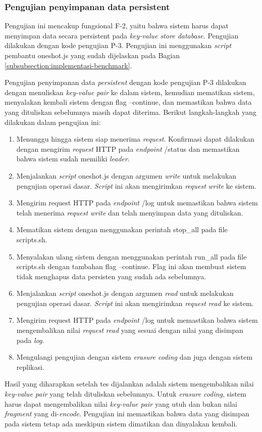 \subsubsection{Pengujian penyimpanan data persistent}
\label{subsubsection:pengujian-penyimpanan-data-persistent}

Pengujian ini mencakup fungsional F-2, yaitu bahwa sistem harus dapat menyimpan data secara persistent pada \textit{key-value store database}. Pengujian dilakukan dengan kode pengujian P-3. Pengujian ini menggunakan \textit{script} pembantu oneshot.js yang sudah dijelaskan pada Bagian \ref{subsubsection:implementasi-benchmark}.

Pengujian penyimpanan data \textit{persistent} dengan kode pengujian P-3 dilakukan dengan menuliskan \textit{key-value pair} ke dalam sistem, kemudian mematikan sistem, menyalakan kembali sistem dengan flag --continue, dan memastikan bahwa data yang dituliskan sebelumnya masih dapat diterima. Berikut langkah-langkah yang dilakukan dalam pengujian ini:

\begin{enumerate}
	\item Menunggu hingga sistem siap menerima \textit{request}. Konfirmasi dapat dilakukan dengan mengirim \textit{request} HTTP pada \textit{endpoint} /status dan memastikan bahwa sistem sudah memiliki \textit{leader}.
	\item Menjalankan \textit{script} oneshot.js dengan argumen \textit{write} untuk melakukan pengujian operasi dasar. \textit{Script} ini akan mengirimkan \textit{request} \textit{write} ke sistem.
	\item Mengirim request HTTP pada \textit{endpoint} /log untuk memastikan bahwa sistem telah menerima \textit{request} \textit{write} dan telah menyimpan data yang dituliskan.
	\item Mematikan sistem dengan menggunakan perintah stop\_all pada file scripts.sh.
	\item Menyalakan ulang sistem dengan menggunakan perintah run\_all pada file scripts.sh dengan tambahan flag --continue. Flag ini akan membuat sistem tidak menghapus data persisten yang sudah ada sebelumnya.
	\item Menjalankan \textit{script} oneshot.js dengan argumen \textit{read} untuk melakukan pengujian operasi dasar. \textit{Script} ini akan mengirimkan \textit{request} \textit{read} ke sistem.
	\item Mengirim request HTTP pada \textit{endpoint} /log untuk memastikan bahwa sistem mengembalikan nilai \textit{request} \textit{read} yang sesuai dengan nilai yang disimpan pada \textit{log}.
	\item Mengulangi pengujian dengan sistem \textit{erasure coding} dan juga dengan sistem replikasi.
\end{enumerate}

Hasil yang diharapkan setelah tes dijalankan adalah sistem mengembalikan nilai \textit{key-value pair} yang telah dituliskan sebelumnya. Untuk \textit{erasure coding}, sistem harus dapat mengembalikan nilai \textit{key-value pair} yang utuh dan bukan nilai \textit{fragment} yang di-\textit{encode}. Pengujian ini memastikan bahwa data yang disimpan pada sistem tetap ada meskipun sistem dimatikan dan dinyalakan kembali.